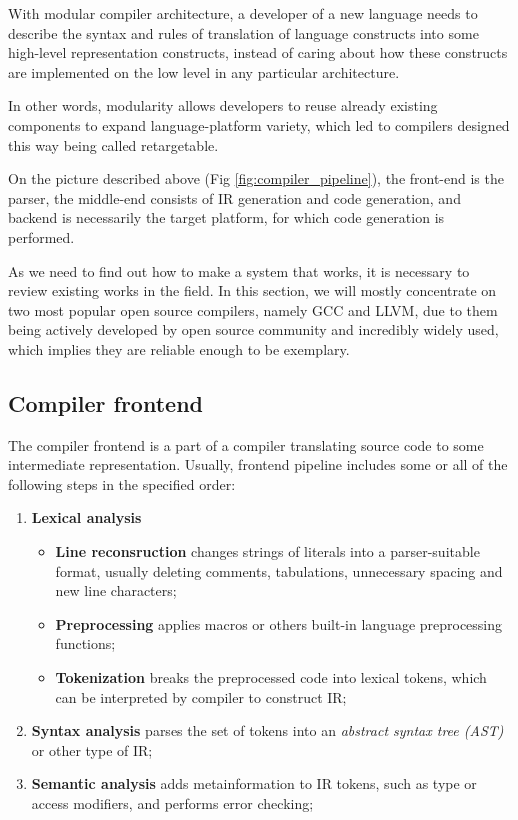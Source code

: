 With modular compiler architecture, a developer of a new language needs to describe the syntax and rules of translation of language constructs into some high-level representation constructs, instead of caring about how these constructs are implemented on the low level in any particular architecture.

In other words, modularity allows developers to reuse already existing components to expand language-platform variety, which led to compilers designed this way being called retargetable.

On the picture described above (Fig \ref{fig:compiler_pipeline}), the front-end is the parser, the middle-end consists of IR generation and code generation, and backend is necessarily the target platform, for which code generation is performed.

As we need to find out how to make a system that works, it is necessary to review existing works in the field. In this section, we will mostly concentrate on two most popular open source compilers, namely GCC and LLVM, due to them being actively developed by open source community and incredibly widely used, which implies they are reliable enough to be exemplary.
 

\subsection{Compiler frontend}
The compiler frontend is a part of a compiler translating source code to some intermediate representation. 
Usually, frontend pipeline includes some or all of the following steps in the specified order:
\begin{enumerate}
    \item \textbf{Lexical analysis}
    \begin{itemize}
        \item \textbf{Line reconsruction} changes strings of literals into a parser-suitable format, usually deleting comments, tabulations, unnecessary spacing and new line characters;
        \item \textbf{Preprocessing} applies macros or others built-in language preprocessing functions; 
        \item \textbf{Tokenization} breaks the preprocessed code into lexical tokens, which can be interpreted by compiler to construct IR;
    \end{itemize}
    \item \textbf{Syntax analysis} parses the set of tokens into an \textit{abstract syntax tree (AST)} or other type of IR;
    \item \textbf{Semantic analysis} adds metainformation to IR tokens, such as type or access modifiers, and performs error checking; 
\end{enumerate}

